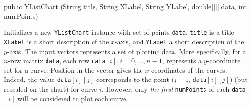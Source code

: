 \begin{htmlonly}
\end{htmlonly}
\begin{code}

   public YListChart (String title, String XLabel, String YLabel,
                      double[][] data, int numPoints) \begin{hide} {
      super();
      dataset = new YListSeriesCollection(data, numPoints);
      init (title, XLabel, YLabel);
   }
}\end{hide}
\end{code}
\begin{tabb}
   Initializes a new \texttt{YListChart} instance with set of points \texttt{data}.
   \texttt{title} is a title, \texttt{XLabel} is a short description of
   the $x$-axis, and \texttt{YLabel}  a short description of the $y$-axis.
   The input vectors represents a set of plotting data. More specifically,
   for a $n$-row matrix \texttt{data}, each row \texttt{data}$[i],
   i=0,\ldots, n-1$, represents a $y$-coordinate set for a curve.
   Position in the vector gives the $x$-coordinates of the curves.
   Indeed, the value \texttt{data}$[i][j]$ corresponds to the point
   $(j+1$, \texttt{data}$[i][j]$) (but rescaled on the chart) for curve $i$.
   However, only \emph{the first} \texttt{numPoints} of each \texttt{data}$[i]$
    will be considered to plot each curve.
\end{tabb}
\begin{htmlonly}
\end{htmlonly}
